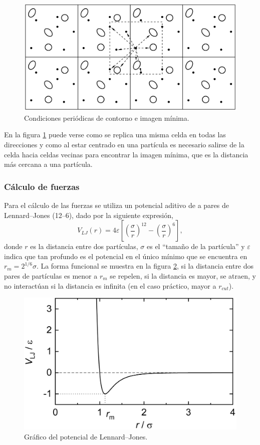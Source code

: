 \documentclass[a4paper,spanish,12pt,twoside]{article}
\begin{document}
\begin{figure}[h]
	\centering
	\includegraphics[width=.7\textwidth]{pbc.png}
	\caption{Condiciones periódicas de contorno e imagen mínima.}
	\label{fig:pbc}
\end{figure}

En la figura \ref{fig:pbc} puede verse como se replica una misma celda en todas las direcciones y como al estar centrado en una partícula es necesario salirse de la celda hacia celdas vecinas para encontrar la imagen mínima, que es la distancia más cercana a una partícula.

\subsubsection{Cálculo de fuerzas}

Para el cálculo de las fuerzas se utiliza un potencial aditivo de a pares de Lennard--Jones (12--6), dado por la siguiente expresión,
$$
V_{LJ}(r) = 4\varepsilon \left[ \left( \frac{\sigma}{r} \right)^{12} - \left( \frac{\sigma}{r} \right)^6 \right],
$$
donde $r$ es la distancia entre dos partículas, $\sigma$ es el ``tamaño de la partícula'' y $\varepsilon$ indica que tan profundo es el potencial en el único mínimo que se encuentra en $r_m = 2^{1/6}\sigma$. La forma funcional se muestra en la figura \ref{fig:lj}, si la distancia entre dos pares de partículas es menor a $r_m$ se repelen, si la distancia es mayor, se atraen, y no interactúan si la distancia es infinita (en el caso práctico, mayor a $r_{cut}$).
\begin{figure}[h]
	\centering
	\includegraphics[width=.7\textwidth]{lj.png}
	\caption{Gráfico del potencial de Lennard--Jones.}
	\label{fig:lj}
\end{figure}
\end{document}
